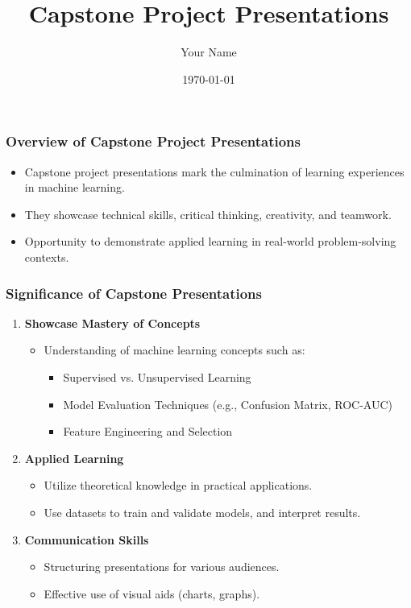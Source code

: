 \documentclass{beamer}
\title{Capstone Project Presentations}
\author{Your Name}
\institute{Your Institution}
\date{\today}
\begin{document}
\frame{\titlepage}

\begin{frame}[fragile]
    \titlepage
\end{frame}

\begin{frame}[fragile]
    \frametitle{Overview of Capstone Project Presentations}
    \begin{itemize}
        \item Capstone project presentations mark the culmination of learning experiences in machine learning.
        \item They showcase technical skills, critical thinking, creativity, and teamwork.
        \item Opportunity to demonstrate applied learning in real-world problem-solving contexts.
    \end{itemize}
\end{frame}

\begin{frame}[fragile]
    \frametitle{Significance of Capstone Presentations}
    \begin{enumerate}
        \item \textbf{Showcase Mastery of Concepts}
            \begin{itemize}
                \item Understanding of machine learning concepts such as:
                \begin{itemize}
                    \item Supervised vs. Unsupervised Learning
                    \item Model Evaluation Techniques (e.g., Confusion Matrix, ROC-AUC)
                    \item Feature Engineering and Selection
                \end{itemize}
            \end{itemize}
        \item \textbf{Applied Learning}
            \begin{itemize}
                \item Utilize theoretical knowledge in practical applications.
                \item Use datasets to train and validate models, and interpret results.
            \end{itemize}
        \item \textbf{Communication Skills}
            \begin{itemize}
                \item Structuring presentations for various audiences.
                \item Effective use of visual aids (charts, graphs).
            \end{itemize}
    \end{enumerate}
\end{frame}
\end{document}
